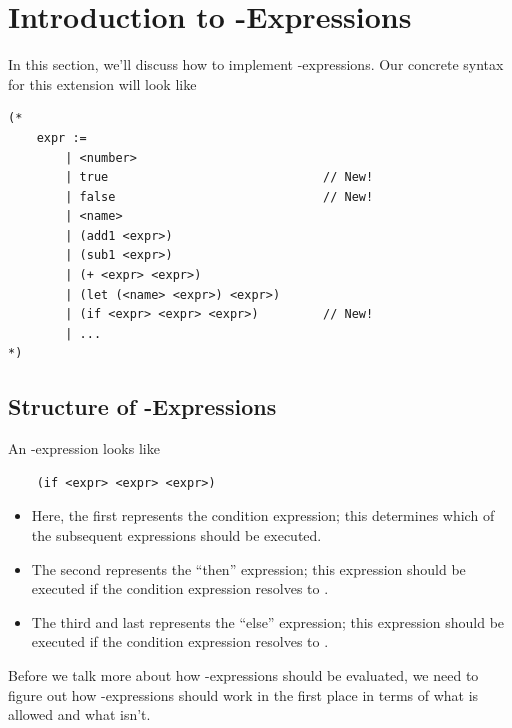 \section{Introduction to -Expressions}
In this section, we'll discuss how to implement -expressions. Our concrete syntax for this extension will look like 
\begin{verbatim}
(*
    expr :=
        | <number>
        | true                              // New!
        | false                             // New!
        | <name>
        | (add1 <expr>)
        | (sub1 <expr>)
        | (+ <expr> <expr>)
        | (let (<name> <expr>) <expr>)
        | (if <expr> <expr> <expr>)         // New!
        | ... 
*)\end{verbatim}

\subsection{Structure of -Expressions}
An -expression looks like 
\begin{verbatim}
    (if <expr> <expr> <expr>)\end{verbatim}

\begin{itemize}
    \item Here, the first  represents the condition expression; this determines which of the subsequent expressions should be executed. 
    \item The second  represents the ``then'' expression; this expression should be executed if the condition expression resolves to .
    \item The third and last  represents the ``else'' expression; this expression should be executed if the condition expression resolves to .
\end{itemize}
Before we talk more about how -expressions should be evaluated, we need to figure out how -expressions should work in the first place in terms of what is allowed and what isn't. 

